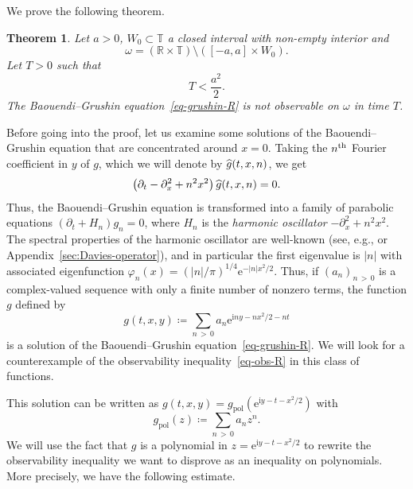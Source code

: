 \documentclass[10pt]{amsart}
\newtheorem{theo}{Theorem}[section]
\theoremstyle{definition}\newtheorem{defi}[theo]{Definition}\newtheorem{rema}[theo]{Remark}\newtheorem{exam}[theo]{Example}\newtheorem{exem}[theo]{Example}\newtheorem{nota}[theo]{Notation}
\newcommand{\1}{\mathds 1}
\newcommand{\R}{\mathbb{R}}
\newcommand{\T}{\mathbb{T}}
\newcommand{\eu}{\mathrm e}
\newcommand{\iu}{\mathrm i}
\newcommand{\pol}{{\mathrm{pol}}}
\newcommand{\f}{\varphi}
\renewcommand{\o}{\omega}
\let\oldhat\hat
\renewcommand*{\hat}[1]{\mathchoice{\widehat{#1}}{\widehat{#1}}{\oldhat{#1}}{\oldhat{#1}}}
\begin{document}
We prove the following theorem.

\begin{theo}\label{th-model-neg}
Let $a>0$, $W_0\subset \T$ a closed interval with non-empty interior and
\begin{equation}\label{eq-def-o-model}
\o = (\R\times \T)\setminus([-a,a]\times W_0).
\end{equation}
Let $T>0$ such that
\[
T < \frac{a^2}2.
\]
The Baouendi--Grushin equation~\eqref{eq-grushin-R} is not observable on $\o$ in time $T$.
\end{theo}

Before going into the proof, let us examine some solutions of the Baouendi--Grushin equation that are concentrated around $x=0$. Taking the $n^{\rm th}$ Fourier coefficient in $y$ of $g$, which we will denote by $\hat g(t,x,n)$, we get
\begin{equation}\label{eq-grushin-R-fourier}
\left(\partial_t -\partial_x^2 +n^2x^2\right)\hat g(t,x,n) = 0.
\end{equation}
Thus, the Baouendi--Grushin equation is transformed into a family of parabolic equations $(\partial_t + H_n)g_n = 0$, where $H_n$ is the \emph{harmonic oscillator} $-\partial_x^2 + n^2 x^2$. The spectral properties of the harmonic oscillator are well-known (see, e.g., \cite[\S~1.3]{Helffer13} or Appendix~\ref{sec:Davies-operator}), and in particular the first eigenvalue is $|n|$ with associated eigenfunction $\f_n(x) = (|n|/\pi)^{1/4} \eu^{-|n|x^2\!/2}$. Thus, if $(a_n)_{n\,>\,0}$ is a complex-valued sequence with only a finite number of nonzero terms, the function $g$ defined by
\begin{equation}\label{eq-model-solution}
g(t,x,y) \coloneqq \sum_{n\,>\,0} a_n \eu^{\iu n y - n x^2\!/2 - nt}
\end{equation}
is a solution of the Baouendi--Grushin equation~\eqref{eq-grushin-R}. We will look for a counterexample of the observability inequality~\eqref{eq-obs-R} in this class of functions.

This solution can be written as $g(t,x,y) = g_\pol(\eu^{\iu y - t -x^2\!/2})$ with
\begin{equation}\label{eq-model-polyn}
g_\pol(z) \coloneqq \sum_{n\,>\,0} a_n z^n.
\end{equation}
We will use the fact that $g$ is a polynomial in $z = \eu^{\iu y - t -x^2\!/2}$ to rewrite the observability inequality we want to disprove as an inequality on polynomials. More precisely, we have the following estimate.
\end{document}
